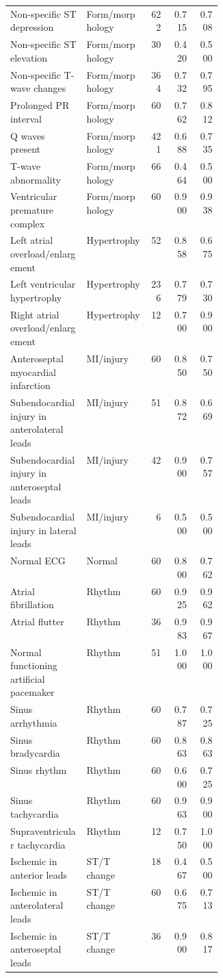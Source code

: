 \begin{longtable}{p{0.36\linewidth}lrrr}
Non-specific ST depression & Form/morphology & 622 & 0.715 & 0.708 \\
Non-specific ST elevation & Form/morphology & 30 & 0.420 & 0.500 \\
Non-specific T-wave changes & Form/morphology & 364 & 0.732 & 0.795 \\
Prolonged PR interval & Form/morphology & 60 & 0.762 & 0.812 \\
Q waves present & Form/morphology & 421 & 0.688 & 0.735 \\
T-wave abnormality & Form/morphology & 66 & 0.464 & 0.500 \\
Ventricular premature complex & Form/morphology & 60 & 0.900 & 0.938 \\
Left atrial overload/enlargement & Hypertrophy & 52 & 0.858 & 0.675 \\
Left ventricular hypertrophy & Hypertrophy & 236 & 0.779 & 0.730 \\
Right atrial overload/enlargement & Hypertrophy & 12 & 0.700 & 0.900 \\
Anteroseptal myocardial infarction & MI/injury & 60 & 0.850 & 0.750 \\
Subendocardial injury in anterolateral leads & MI/injury & 51 & 0.872 & 0.669 \\
Subendocardial injury in anteroseptal leads & MI/injury & 42 & 0.900 & 0.757 \\
Subendocardial injury in lateral leads & MI/injury & 6 & 0.500 & 0.500 \\
Normal ECG & Normal & 60 & 0.800 & 0.762 \\
Atrial fibrillation & Rhythm & 60 & 0.925 & 0.962 \\
Atrial flutter & Rhythm & 36 & 0.983 & 0.967 \\
Normal functioning artificial pacemaker & Rhythm & 51 & 1.000 & 1.000 \\
Sinus arrhythmia & Rhythm & 60 & 0.787 & 0.725 \\
Sinus bradycardia & Rhythm & 60 & 0.863 & 0.863 \\
Sinus rhythm & Rhythm & 60 & 0.600 & 0.725 \\
Sinus tachycardia & Rhythm & 60 & 0.963 & 0.900 \\
Supraventricular tachycardia & Rhythm & 12 & 0.750 & 1.000 \\
Ischemic in anterior leads & ST/T change & 18 & 0.467 & 0.500 \\
Ischemic in anterolateral leads & ST/T change & 60 & 0.675 & 0.713 \\
Ischemic in anteroseptal leads & ST/T change & 36 & 0.900 & 0.817 \\

\end{longtable}
